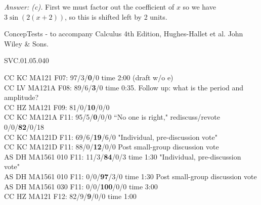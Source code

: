 {\it Answer: (c).}  First we must factor out the coefficient of $x$ so we have $3 \sin ( 2 (x + 2))$, so this is shifted left by 2 units.

\medskip


ConcepTests - to accompany Calculus 4th Edition, Hughes-Hallet et al. John Wiley \& Sons.

SVC.01.05.040


CC KC MA121 F07: 97/3/{\bf0}/0 time 2:00 (draft w/o e)\\
CC LV MA121A F08: 89/6/{\bf3}/0 time 0:35.  Follow up: what is the period and amplitude?\\
CC HZ MA121 F09: 81/0/{\bf10}/0/0  \\
CC KC MA121A F11: 95/5/{\bf0}/0/0 ``No one is right," rediscuss/revote 0/0/{\bf 82}/0/18 \\
CC KC MA121D F11: 69/6/{\bf19}/6/0 "Individual, pre-discussion vote" \\
CC KC MA121D F11: 88/0/{\bf12}/0/0 Post small-group discussion vote \\
AS DH MA1561 010 F11: 11/3/{\bf84}/0/3 time 1:30 "Individual, pre-discussion vote" \\
AS DH MA1561 010 F11: 0/0/{\bf97}/3/0 time 1:30 Post small-group discussion vote \\
AS DH MA1561 030 F11: 0/0/{\bf100}/0/0 time 3:00  \\
CC HZ MA121 F12: 82/9/{\bf9}/0/0 time 1:00  \\
